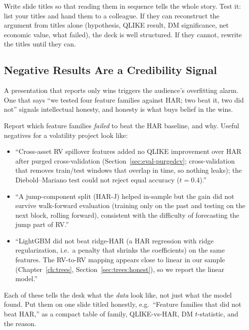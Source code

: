 \begin{keyidea}
Write slide titles so that reading them in sequence tells the whole story. Test it: list your titles and hand them to a colleague. If they can reconstruct the argument from titles alone (hypothesis, QLIKE result, DM significance, net economic value, what failed), the deck is well structured. If they cannot, rewrite the titles until they can.
\end{keyidea}

\subsection{Negative Results Are a Credibility Signal}
\label{subsec:negatives}

A presentation that reports only wins triggers the audience's overfitting alarm. One that says ``we tested four feature families against HAR; two beat it, two did not'' signals intellectual honesty, and honesty is what buys belief in the wins.

Report which feature families \emph{failed} to beat the HAR baseline, and why. Useful negatives for a volatility project look like:
\begin{itemize}[leftmargin=1.5em]
  \item ``Cross-asset RV spillover features added no QLIKE improvement over HAR after purged cross-validation (Section~\ref{sec:eval-purgedcv}; cross-validation that removes train/test windows that overlap in time, so nothing leaks); the Diebold--Mariano test could not reject equal accuracy ($t = 0.4$).''
  \item ``A jump-component split (HAR-J) helped in-sample but the gain did not survive walk-forward evaluation (training only on the past and testing on the next block, rolling forward), consistent with the difficulty of forecasting the jump part of RV.''
  \item ``LightGBM did not beat ridge-HAR (a HAR regression with ridge regularization, i.e.\ a penalty that shrinks the coefficients) on the same features. The RV-to-RV mapping appears close to linear in our sample (Chapter~\ref{ch:trees}, Section~\ref{sec:trees:honest}), so we report the linear model.''
\end{itemize}
Each of these tells the desk what the \emph{data} look like, not just what the model found. Put them on one slide titled honestly, e.g.\ ``Feature families that did not beat HAR,'' as a compact table of family, QLIKE-vs-HAR, DM $t$-statistic, and the reason.

